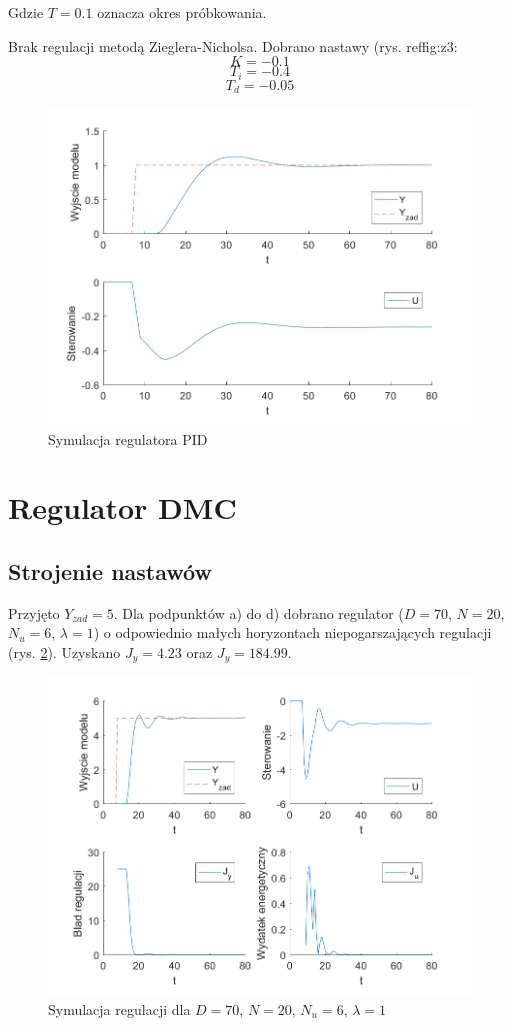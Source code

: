 \documentclass[a4paper, 10pt]{article}
\begin{document}
	Gdzie $T=0.1$ oznacza okres próbkowania.
	
	Brak regulacji metodą Zieglera-Nicholsa. Dobrano nastawy (rys. ref{fig:z3}:
	\[K = -0.1\]
	\[T_i = -0.4\]
	\[T_d = -0.05\]
	
		
	\begin{figure}[H]
			\centering
			\includegraphics[width=0.9\linewidth]{z3}
			\caption{Symulacja regulatora PID}
			\label{fig:z3}
			\end{figure}
	
	\section{Regulator DMC}
	\subsection{Strojenie nastawów}
	Przyjęto $Y_{zad}=5$. Dla podpunktów a) do d) dobrano regulator ($D=70$, $N=20$, $N_u=6$, $\lambda=1$) o odpowiednio małych horyzontach niepogarszających regulacji (rys. \ref{fig:z4_1}). Uzyskano $J_y=4.23$ oraz $J_y = 184.99$.
	
	\begin{figure}[H]
			\centering
			\includegraphics[width=0.9\linewidth]{z4_70_20_6_1}
			\caption{Symulacja regulacji dla $D=70$, $N=20$, $N_u=6$, $\lambda=1$}
			\label{fig:z4_1}
			\end{figure}
			
\end{document}
